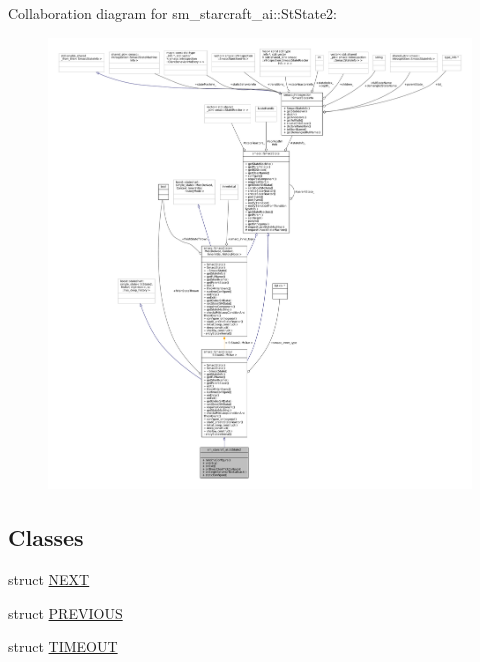 Collaboration diagram for sm\+\_\+starcraft\+\_\+ai\+:\+:St\+State2\+:
\nopagebreak
\begin{figure}[H]
\begin{center}
\leavevmode
\includegraphics[width=350pt]{structsm__starcraft__ai_1_1StState2__coll__graph}
\end{center}
\end{figure}
\subsection*{Classes}
\begin{DoxyCompactItemize}
\item 
struct \hyperlink{structsm__starcraft__ai_1_1StState2_1_1NEXT}{N\+E\+XT}
\item 
struct \hyperlink{structsm__starcraft__ai_1_1StState2_1_1PREVIOUS}{P\+R\+E\+V\+I\+O\+US}
\item 
struct \hyperlink{structsm__starcraft__ai_1_1StState2_1_1TIMEOUT}{T\+I\+M\+E\+O\+UT}
\end{DoxyCompactItemize}
